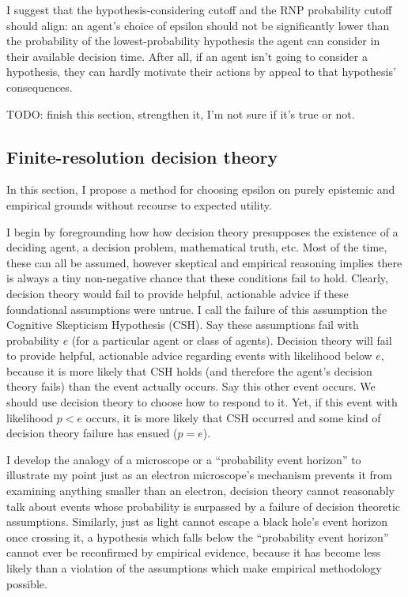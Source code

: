 \documentclass{article}
\begin{document}
I suggest that the hypothesis-considering cutoff and the RNP probability cutoff should align: an agent's choice of epsilon should not be significantly lower than the probability of the lowest-probability hypothesis the agent can consider in their available decision time. After all, if an agent isn't going to consider a hypothesis, they can hardly motivate their actions by appeal to that hypothesis' consequences.

TODO: finish this section, strengthen it, I'm not sure if it's true or not.

\subsection{Finite-resolution decision theory}

In this section, I propose a method for choosing epsilon on purely epistemic and empirical grounds without recourse to expected utility. 

I begin by foregrounding how how decision theory presupposes the existence of a deciding agent, a decision problem, mathematical truth, etc. Most of the time, these can all be assumed, however skeptical and empirical reasoning implies there is always a tiny non-negative chance that these conditions fail to hold. Clearly, decision theory would fail to provide helpful, actionable advice if these foundational assumptions were untrue. I call the failure of this assumption the Cognitive Skepticism Hypothesis (CSH). Say these assumptions fail with probability \(e\) (for a particular agent or class of agents). Decision theory will fail to provide helpful, actionable advice regarding events with likelihood below \(e\), because it is more likely that CSH holds (and therefore the agent's decision theory fails) than the event actually occurs. Say this other event occurs. We should use decision theory to choose how to respond to it. Yet, if this event with likelihood \(p<e\) occurs, it is more likely that CSH occurred and some kind of decision theory failure has ensued (\(p=e\)).

I develop the analogy of a microscope or a ``probability event horizon'' to illustrate my point \textemdash{} just as an electron microscope's mechanism prevents it from examining anything smaller than an electron, decision theory cannot reasonably talk about events whose probability is surpassed by a failure of decision theoretic assumptions. Similarly, just as light cannot escape a black hole's event horizon once crossing it, a hypothesis which falls below the ``probability event horizon'' cannot ever be reconfirmed by empirical evidence, because it has become less likely than a violation of the assumptions which make empirical methodology possible. 
\end{document}
